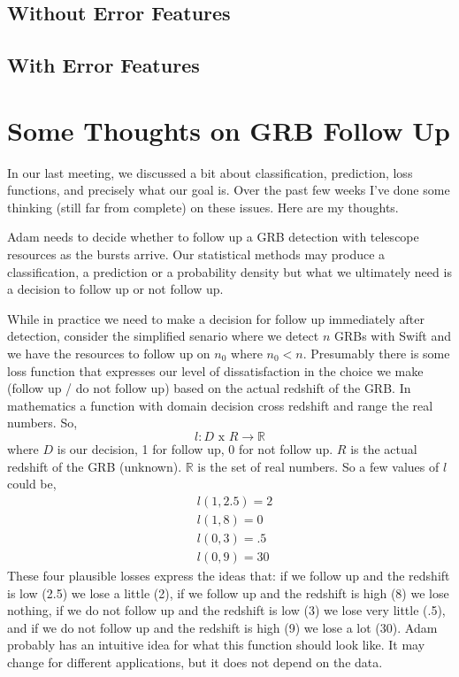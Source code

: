 \documentclass[10pt]{article}
\begin{document}
\subsection{Without Error Features}


\subsection{With Error Features}


\section{Some Thoughts on GRB Follow Up}
In our last meeting, we discussed a bit about classification,  prediction, loss functions, and precisely what our goal is. Over the past few weeks I've done some thinking (still far from complete) on these issues. Here are my thoughts.

Adam needs to decide whether to follow up a GRB detection with telescope resources as the bursts arrive. Our statistical methods may produce a classification, a prediction or a probability density but what we ultimately need is a decision to follow up or not follow up. 

While in practice we need to make a decision for follow up immediately after detection, consider the simplified senario where we detect $n$ GRBs with Swift and we have the resources to follow up on $n_0$ where $n_0 < n$. Presumably there is some loss function that expresses our level of dissatisfaction in the choice we make (follow up / do not follow up) based on the actual redshift of the GRB. In mathematics a function with domain decision cross redshift and range the real numbers. So,
\begin{equation}
l:D \text{ x } R \rightarrow \mathbb{R}
\end{equation} 
where $D$ is our decision, 1 for follow up, 0 for not follow up. $R$ is the actual redshift of the GRB (unknown). $\mathbb{R}$ is the set of real numbers. So a few values of $l$ could be,
\begin{align*}
&l(1,2.5) = 2\\
&l(1,8) = 0\\
&l(0,3) = .5\\
&l(0,9) = 30
\end{align*}
These four plausible losses express the ideas that: if we follow up and the redshift is low (2.5) we lose a little (2), if we follow up and the redshift is high (8) we lose nothing, if we do not follow up and the redshift is low (3) we lose very little (.5), and if we do not follow up and the redshift is high (9) we lose a lot (30). Adam probably has an intuitive idea for what this function should look like. It may change for different applications, but it does not depend on the data.
\end{document}
